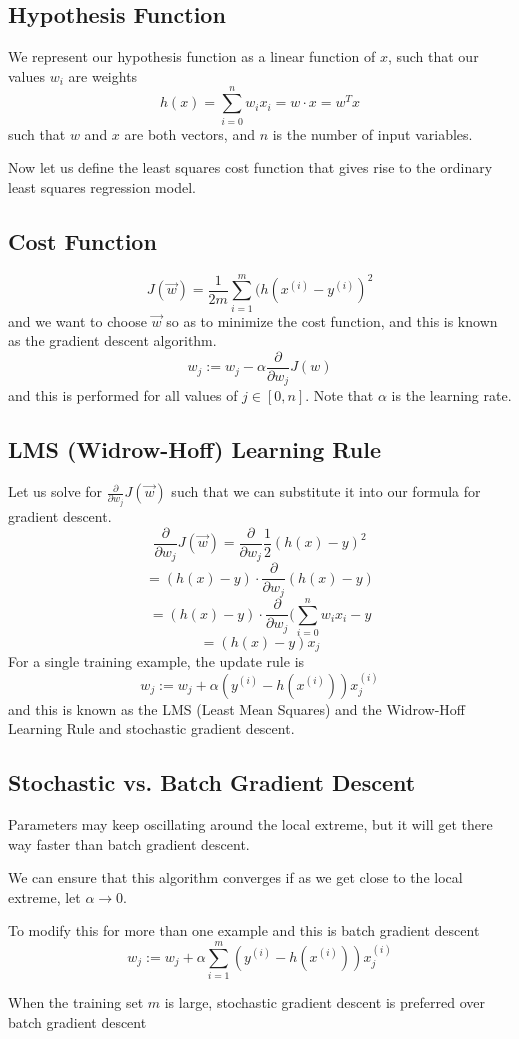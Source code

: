 \documentclass[12pt]{scrartcl}
\begin{document}
\subsection{Hypothesis Function}
We represent our hypothesis function as a linear function of $x$, such that our values $w_i$ are weights
\[h(x) = \sum_{i=0}^nw_ix_i = w \cdot x = w^Tx\]
such that $w$  and $x$  are both vectors, and $n$ is the number of input variables.

Now let us define the least squares cost function that gives rise to the ordinary least squares regression model.

\subsection{Cost Function}
\[J(\vec{w}) = \frac{1}{2m} \sum_{i=1}^m(h(x^{(i)} - y^{(i)})^2\]
and we want to choose $\vec{w}$ so as to minimize the cost function, and this is known as the gradient descent algorithm.
\[w_j := w_j - \alpha \frac{\partial}{\partial w_j}J(w)\]
and this is performed for all values of $j \in [0, n]$. Note that $\alpha$ is the learning rate.
\subsection{LMS (Widrow-Hoff) Learning Rule}
Let us solve for $\frac{\partial}{\partial w_j}J(\vec{w})$ such that we can substitute it into our formula for gradient descent.
\[\frac{\partial}{\partial w_j}J(\vec{w}) = \frac{\partial}{\partial w_j}\frac{1}{2}(h(x) - y)^2\]
\[= (h(x) - y) \cdot \frac{\partial}{\partial w_j}(h(x) - y)\]
\[= (h(x) - y) \cdot \frac{\partial}{\partial w_j}(\sum_{i=0}^nw_ix_i - y\]
\[= (h(x) - y)x_j\]
For a single training example, the update rule is 
\[w_j := w_j + \alpha(y^{(i)} - h(x^{(i)}))x_j^{(i)}\]
and this is known as the LMS (Least Mean Squares) and the Widrow-Hoff Learning Rule and stochastic gradient descent.
\subsection{Stochastic vs. Batch Gradient Descent}
\begin{note}
    Parameters may keep oscillating around the local extreme, but it will get there way faster than batch gradient descent.
\end{note}
\begin{note}
    We can ensure that this algorithm converges if as we get close to the local extreme, let $\alpha \to 0$.
\end{note}
To modify this for more than one example and this is batch gradient descent
\[w_j:= w_j + \alpha \sum_{i=1}^m(y^{(i)} - h(x^{(i)}))x_j^{(i)}\]
\begin{note}
    When the training set $m$ is large, stochastic gradient descent is preferred over batch gradient descent
\end{note}
\end{document}
